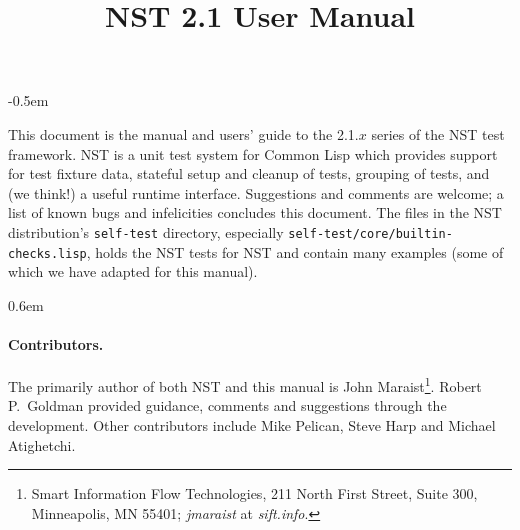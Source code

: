 \documentclass{article}
\title{NST 2.1 User Manual}
\begin{document}
\maketitle
\thispagestyle{empty}
\parskip -0.5em

\noindent This document is the manual and users' guide to the 2.1.$x$
series of the NST test framework.  NST is a unit test system for
Common Lisp which provides support for test fixture data, stateful
setup and cleanup of tests, grouping of tests, and (we think!) a
useful runtime interface.  Suggestions and comments are welcome; a
list of known bugs and infelicities concludes this document.  The
files in the NST distribution's \texttt{self-test} directory,
especially \texttt{self-test/core/builtin-checks.lisp}, holds the NST
tests for NST and contain many examples (some of which we have adapted
for this manual).

\tableofcontents
\parskip 0.6em
\parindent 0pt

\paragraph{Contributors.}
The primarily author of both NST and this manual is John
Maraist\footnote{Smart Information Flow Technologies, 211 North First
  Street, Suite 300, Minneapolis, MN 55401; \textsl{jmaraist} at
  \textsl{sift.info}.}.  Robert P.\ Goldman provided guidance,
comments and suggestions through the development.  Other contributors
include Mike Pelican, Steve Harp and Michael Atighetchi.
\cleardoublepage {}








\appendix
{}




\printindex
\end{document}
